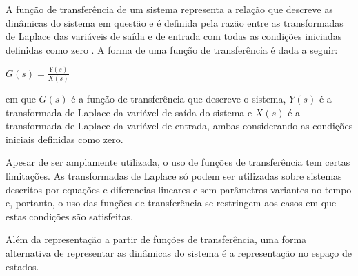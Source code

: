 A função de transferência de um sistema representa a relação que descreve as dinâmicas do sistema em questão e é definida pela razão entre as transformadas de Laplace das variáveis de saída e de entrada com todas as condições iniciadas definidas como zero \cite[p.~65]{Dorf2011}. A forma de uma função de transferência é dada a seguir:
\begin{center}
$G(s) = \frac{Y(s)}{X(s)}$
\end{center}
em que $G(s)$ é a função de transferência que descreve o sistema, $Y(s)$ é a transformada de Laplace da variável de saída do sistema e $X(s)$ é a transformada de Laplace da variável de entrada, ambas considerando as condições iniciais definidas como zero.

Apesar de ser amplamente utilizada, o uso de funções de transferência tem certas limitações. As transformadas de Laplace só podem ser utilizadas sobre sistemas descritos por equações e diferencias lineares e sem parâmetros variantes no tempo e, portanto, o uso das funções de transferência se restringem aos casos em que estas condições são satisfeitas.

Além da representação a partir de funções de transferência, uma forma alternativa de representar as dinâmicas do sistema é a representação no espaço de estados.

